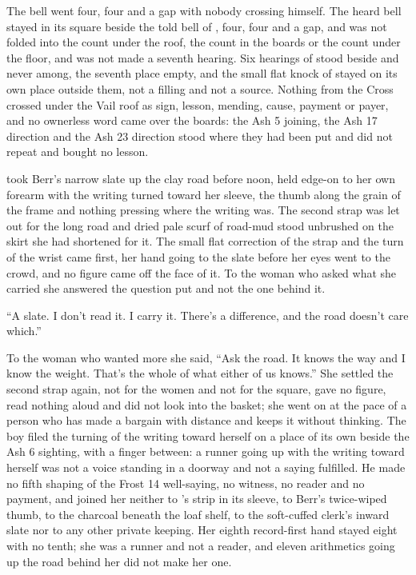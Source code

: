 The bell went four, four and a gap with nobody crossing himself. The heard bell stayed in its square beside the told bell of , four, four and a gap, and was not folded into the count under the roof, the count in the boards or the count under the floor, and was not made a seventh hearing. Six hearings of  stood beside and never among, the seventh place empty, and the small flat knock of  stayed on its own place outside them, not a filling and not a source. Nothing from the Cross crossed under the Vail roof as sign, lesson, mending, cause, payment or payer, and no ownerless word came over the boards: the Ash 5 joining, the Ash 17 direction and the Ash 23 direction stood where they had been put and did not repeat and bought no lesson.

 took Berr's narrow slate up the clay road before noon, held edge-on to her own forearm with the writing turned toward her sleeve, the thumb along the grain of the frame and nothing pressing where the writing was. The second strap was let out for the long road and dried pale scurf of road-mud stood unbrushed on the skirt she had shortened for it. The small flat correction of the strap and the turn of the wrist came first, her hand going to the slate before her eyes went to the crowd, and no figure came off the face of it. To the woman who asked what she carried she answered the question put and not the one behind it.

“A slate. I don't read it. I carry it. There's a difference, and the road doesn't care which.”

To the woman who wanted more she said, “Ask the road. It knows the way and I know the weight. That's the whole of what either of us knows.” She settled the second strap again, not for the women and not for the square, gave no figure, read nothing aloud and did not look into the basket; she went on at the pace of a person who has made a bargain with distance and keeps it without thinking. The boy filed the turning of the writing toward herself on a place of its own beside the Ash 6 sighting, with a finger between: a runner going up with the writing toward herself was not a voice standing in a doorway and not a saying fulfilled. He made no fifth shaping of the Frost 14 well-saying, no witness, no reader and no payment, and joined her neither to 's strip in its sleeve, to Berr's twice-wiped thumb, to the charcoal beneath the loaf shelf, to the soft-cuffed clerk's inward slate nor to any other private keeping. Her eighth record-first hand stayed eight with no tenth; she was a runner and not a reader, and eleven arithmetics going up the road behind her did not make her one.

